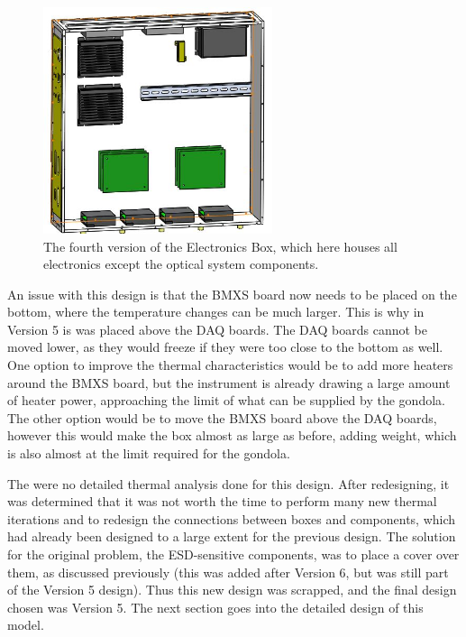 \begin{figure}
    \centering
    \includegraphics[width=0.6\textwidth]{chap3_images/LIFE_V6_images/EBOX_V4.JPG}
    \caption{The fourth version of the Electronics Box, which here houses all electronics except the optical system components.}
    \label{fig:EBOX_V4}
\end{figure}

An issue with this design is that the BMXS board now needs to be placed on the bottom, where the temperature changes can be much larger. This is why in Version 5 is was placed above the DAQ boards. The DAQ boards cannot be moved lower, as they would freeze if they were too close to the bottom as well. One option to improve the thermal characteristics would be to add more heaters around the BMXS board, but the instrument is already drawing a large amount of heater power, approaching the limit of what can be supplied by the gondola. The other option would be to move the BMXS board above the DAQ boards, however this would make the box almost as large as before, adding weight, which is also almost at the limit required for the gondola.

The were no detailed thermal analysis done for this design. After redesigning, it was determined that it was not worth the time to perform many new thermal iterations and to redesign the connections between boxes and components, which had already been designed to a large extent for the previous design. The solution for the original problem, the ESD-sensitive components, was to place a cover over them, as discussed previously (this was added after Version 6, but was still part of the Version 5 design). Thus this new design was scrapped, and the final design chosen was Version 5. The next section goes into the detailed design of this model.

